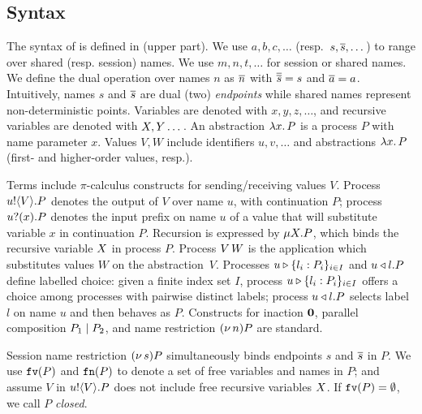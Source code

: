 \subsection{Syntax} 
The syntax of \HOp is defined in  (upper part).
We use $a,b,c, \dots$ (resp.~$s, \overline{s}, \dots$) 
to range over shared (resp. session) names. 
We use $m, n, t, \dots$ for session or shared names. 
We define the dual operation over names $n$ as $\overline{n}$ with
$\overline{\overline{s}} = s$ and $\overline{a} = a$.
Intuitively, names $s$ and $\overline{s}$ are dual (two) \emph{endpoints} while 
shared names represent non-deterministic points. 
Variables are denoted with $x, y, z, \dots$, 
and recursive variables are denoted with $X, Y \dots$.
An abstraction %
$\lambda x.\,P$ is a process $P$ with name parameter $x$.
Values $V,W$ include 
identifiers $u, v, \ldots$ %
and 
abstractions $\lambda x.\,P$ (first- and higher-order values, resp.). 

{Terms} 
include $\pi$-calculus constructs for sending/receiving values $V$.
Process $u ! \langle V \rangle . P$ denotes the output of   $V$
over name $u$, with continuation $P$;
process $u ? (x) . P$ denotes the input prefix on name $u$ of a value
that 
will substitute variable $x$ in continuation $P$. 
Recursion is expressed by $\mu X. P$,
which binds the recursive variable $X$ in process $P$.
Process 
$V\, {W}$ 
is the application
which substitutes values $W$ on the abstraction~$V$. 
Processes $u \triangleright \{l_i: P_i\}_{i \in I}$  and $u \triangleleft l . P$ define labelled choice:
given a finite index set $I$, process $u \triangleright \{l_i: P_i\}_{i \in I}$ offers a choice 
among processes with pairwise distinct labels;
 process $u \triangleleft l . P$ selects label $l$ on name $u$ and then behaves as $P$.
Constructs for 
inaction $\mathbf{0}$,  parallel composition $P_1 \;|\; P_2$, and 
name restriction $(\nu\, n) P$ are standard.

Session name restriction $(\nu\, s) P$ simultaneously binds endpoints $s$ and $\overline{s}$ in $P$.
We use $\mathtt{fv}(P)$ and $\mathtt{fn}(P)$ to denote a set of free 
variables and names in $P$; 
and assume $V$ in $u ! \langle V \rangle .{P}$ does not include free recursive 
variables $X$. 
If $\mathtt{fv}(P) = \emptyset$, we call $P$ {\em closed}.

